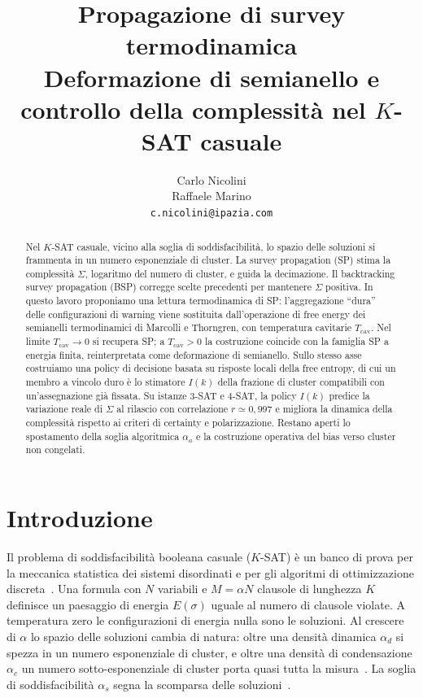 \documentclass{article}
\title{Propagazione di survey termodinamica\\
\large Deformazione di semianello e controllo della complessit\`a nel $K$-SAT casuale}
\author{Carlo Nicolini\\
Raffaele Marino\\
\texttt{c.nicolini@ipazia.com}}
\newcommand{\Sig}{\Sigma}
\newcommand{\Tc}{T_{\mathrm{cav}}}
\begin{document}
\maketitle

\begin{abstract}
Nel $K$-SAT casuale, vicino alla soglia di soddisfacibilit\`a, lo spazio delle soluzioni si frammenta in un numero esponenziale di cluster.
La survey propagation (SP) stima la complessit\`a $\Sig$, logaritmo del numero di cluster, e guida la decimazione.
Il backtracking survey propagation (BSP) corregge scelte precedenti per mantenere $\Sig$ positiva.
In questo lavoro proponiamo una lettura termodinamica di SP: l'aggregazione ``dura'' delle configurazioni di warning viene sostituita dall'operazione di free energy dei semianelli termodinamici di Marcolli e Thorngren, con temperatura cavitarie $\Tc$.
Nel limite $\Tc\to 0$ si recupera SP; a $\Tc>0$ la costruzione coincide con la famiglia SP a energia finita, reinterpretata come deformazione di semianello.
Sullo stesso asse costruiamo una policy di decisione basata su risposte locali della free entropy, di cui un membro a vincolo duro \`e lo stimatore $I(k)$ della frazione di cluster compatibili con un'assegnazione gi\`a fissata.
Su istanze $3$-SAT e $4$-SAT, la policy $I(k)$ predice la variazione reale di $\Sig$ al rilascio con correlazione $r\simeq 0{,}997$ e migliora la dinamica della complessit\`a rispetto ai criteri di certainty e polarizzazione.
Restano aperti lo spostamento della soglia algoritmica $\alpha_a$ e la costruzione operativa del bias verso cluster non congelati.
\end{abstract}

\section{Introduzione}
\label{sec:intro}

Il problema di soddisfacibilit\`a booleana casuale ($K$-SAT) \`e un banco di prova per la meccanica statistica dei sistemi disordinati e per gli algoritmi di ottimizzazione discreta~\cite{mezard2009information}.
Una formula con $N$ variabili e $M=\alpha N$ clausole di lunghezza $K$ definisce un paesaggio di energia $E(\sigma)$ uguale al numero di clausole violate.
A temperatura zero le configurazioni di energia nulla sono le soluzioni.
Al crescere di $\alpha$ lo spazio delle soluzioni cambia di natura: oltre una densit\`a dinamica $\alpha_d$ si spezza in un numero esponenziale di cluster, e oltre una densit\`a di condensazione $\alpha_c$ un numero sotto-esponenziale di cluster porta quasi tutta la misura~\cite{krzakala2007clusters,montanari2008clusters}.
La soglia di soddisfacibilit\`a $\alpha_s$ segna la scomparsa delle soluzioni~\cite{mezard2002analytic,achlioptas2005rigidity}.
\end{document}
